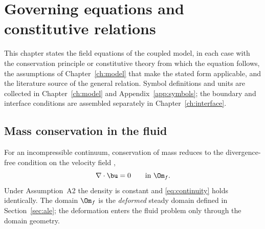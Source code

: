\chapter{Governing equations and constitutive relations}
\label{ch:equations}

This chapter states the field equations of the coupled model, in each case with the conservation
principle or constitutive theory from which the equation follows, the assumptions of
Chapter~\ref{ch:model} that make the stated form applicable, and the literature source of the
general relation. Symbol definitions and units are collected in Chapter~\ref{ch:model} and
Appendix~\ref{app:symbols}; the boundary and interface conditions are assembled separately in
Chapter~\ref{ch:interface}.

\section{Mass conservation in the fluid}
For an incompressible continuum, conservation of mass reduces to the divergence-free condition on
the velocity field \cite{bird1960transport},
\begin{equation}
\nabla\cdot\bu=0 \qquad \text{in } \Om_f .
\label{eq:continuity}
\end{equation}
Under Assumption~A2 the density is constant and \eqref{eq:continuity} holds identically. The domain
$\Om_f$ is the \emph{deformed} steady domain defined in Section~\ref{sec:ale}; the deformation
enters the fluid problem only through the domain geometry.


